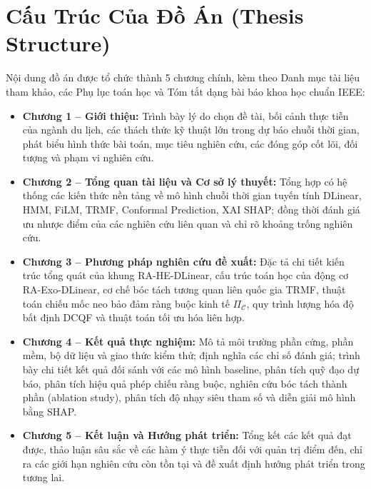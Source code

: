 \section{Cấu Trúc Của Đồ Án (Thesis Structure)}
\label{sec:structure}

Nội dung đồ án được tổ chức thành 5 chương chính, kèm theo Danh mục tài liệu tham khảo, các Phụ lục toán học và Tóm tắt dạng bài báo khoa học chuẩn IEEE:
\begin{itemize}
    \item \textbf{Chương 1 -- Giới thiệu:} Trình bày lý do chọn đề tài, bối cảnh thực tiễn của ngành du lịch, các thách thức kỹ thuật lớn trong dự báo chuỗi thời gian, phát biểu hình thức bài toán, mục tiêu nghiên cứu, các đóng góp cốt lõi, đối tượng và phạm vi nghiên cứu.
    \item \textbf{Chương 2 -- Tổng quan tài liệu và Cơ sở lý thuyết:} Tổng hợp có hệ thống các kiến thức nền tảng về mô hình chuỗi thời gian tuyến tính DLinear, HMM, FiLM, TRMF, Conformal Prediction, XAI SHAP; đồng thời đánh giá ưu nhược điểm của các nghiên cứu liên quan và chỉ rõ khoảng trống nghiên cứu.
    \item \textbf{Chương 3 -- Phương pháp nghiên cứu đề xuất:} Đặc tả chi tiết kiến trúc tổng quát của khung RA-HE-DLinear, cấu trúc toán học của động cơ RA-Exo-DLinear, cơ chế bóc tách tương quan liên quốc gia TRMF, thuật toán chiếu mốc neo bảo đảm ràng buộc kinh tế $\Pi_{\mathcal{C}}$, quy trình lượng hóa độ bất định DCQF và thuật toán tối ưu hóa liên hợp.
    \item \textbf{Chương 4 -- Kết quả thực nghiệm:} Mô tả môi trường phần cứng, phần mềm, bộ dữ liệu và giao thức kiểm thử; định nghĩa các chỉ số đánh giá; trình bày chi tiết kết quả đối sánh với các mô hình baseline, phân tích quỹ đạo dự báo, phân tích hiệu quả phép chiếu ràng buộc, nghiên cứu bóc tách thành phần (ablation study), phân tích độ nhạy siêu tham số và diễn giải mô hình bằng SHAP.
    \item \textbf{Chương 5 -- Kết luận và Hướng phát triển:} Tổng kết các kết quả đạt được, thảo luận sâu sắc về các hàm ý thực tiễn đối với quản trị điểm đến, chỉ ra các giới hạn nghiên cứu còn tồn tại và đề xuất định hướng phát triển trong tương lai.
\end{itemize}
